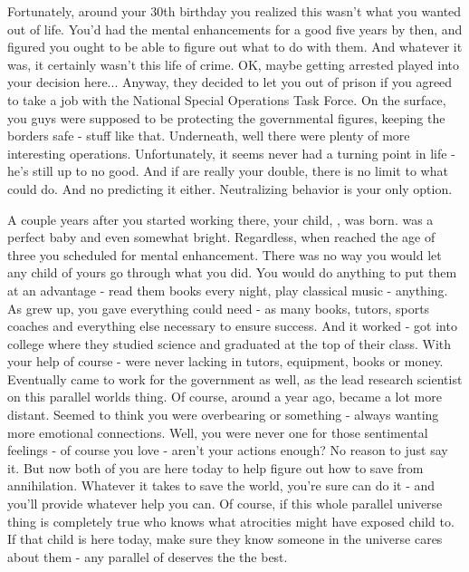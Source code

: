 \documentclass[char]{guildcamp3}
\begin{document}
Fortunately, around your 30th birthday you realized this wasn't what you wanted out of life. You'd had the mental enhancements for a good five years by then, and figured you ought to be able to figure out what to do with them. And whatever it was, it certainly wasn't this life of crime. OK, maybe getting arrested played into your decision here... Anyway, they decided to let you out of prison if you agreed to take a job with the National Special Operations Task Force. On the surface, you guys were supposed to be protecting the governmental figures, keeping the borders safe - stuff like that. Underneath, well there were plenty of more interesting operations. Unfortunately, it seems \cRogueTwo{\formal} never had a turning point in \cRogueTwo{\their} life - he's still up to no good. And if \cRogueTwo{\they} are really your double, there is no limit to what \cRogueTwo{\they} could do. And no predicting it either. Neutralizing \cRogueTwo{\their} behavior is your only option. 

A couple years after you started working there, your child, \cSciOne{\intro}, was born. \cSciOne{\they} was a perfect baby and even somewhat bright. Regardless, when \cSciOne{\they} reached the age of three you scheduled \cSciOne{\them} for mental enhancement. There was no way you would let any child of yours go through what you did. You would do anything to put them at an advantage - read them books every night, play classical music - anything. As \cSciOne{\informal} grew up, you gave \cSciOne{\them} everything \cSciOne{\they} could need - as many books, tutors, sports coaches and everything else necessary to ensure success. And it worked - \cSciOne{\informal} got into college where they studied science and graduated at the top of their class. With your help of course - \cSciOne{\they} were never lacking in tutors, equipment, books or money. Eventually \cSciOne{} came to work for the government as well, as the lead research scientist on this parallel worlds thing. Of course, around a year ago, \cSciOne{\they} became a lot more distant. Seemed to think you were overbearing or something - always wanting more emotional connections. Well, you were never one for those sentimental feelings - of course you love \cSciOne{\them} - aren't your actions enough? No reason to just say it. But now both of you are here today to help figure out how to save \bTechWorld{} from annihilation. Whatever it takes to save the world, you're sure \cSciOne{\informal} can do it - and you'll provide whatever help you can. Of course, if this whole parallel universe thing is completely true who knows what atrocities \cRogueTwo{} might have exposed  child to. If that child is here today, make sure they know someone in the universe cares about them - any parallel of \cSciOne{\informal} deserves the the best. 
\end{document}
